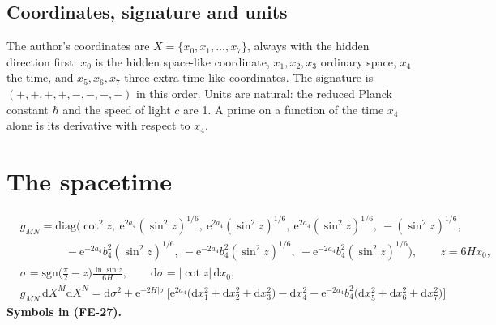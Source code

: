 \documentclass[
  10pt,
]{article}
\begin{document}
\hypertarget{coordinates-signature-and-units}{%
\subsection{Coordinates, signature and
units}\label{coordinates-signature-and-units}}

The author's coordinates are \(X = \{x_0, x_1, \dots, x_7\}\), always
with the hidden direction first: \(x_0\) is the hidden space-like
coordinate, \(x_1, x_2, x_3\) ordinary space, \(x_4\) the time, and
\(x_5, x_6, x_7\) three extra time-like coordinates. The signature is
\((+,+,+,+,-,-,-,-)\) in this order. Units are natural: the reduced
Planck constant \(\hbar\) and the speed of light \(c\) are 1. A prime on
a function of the time \(x_4\) alone is its derivative with respect to
\(x_4\).

\hypertarget{the-spacetime}{%
\section{The spacetime}\label{the-spacetime}}

\[
\begin{aligned}
&g_{MN} = \mathrm{diag}\Big(\cot^2z,\ \mathrm{e}^{2a_4}(\sin^2z)^{1/6},\ \mathrm{e}^{2a_4}(\sin^2z)^{1/6},
 \ \mathrm{e}^{2a_4}(\sin^2z)^{1/6},\ -(\sin^2z)^{1/6},\\
&\qquad\qquad -\mathrm{e}^{-2a_4}b_4^2(\sin^2z)^{1/6},\ -\mathrm{e}^{-2a_4}b_4^2(\sin^2z)^{1/6},
 \ -\mathrm{e}^{-2a_4}b_4^2(\sin^2z)^{1/6}\Big),\qquad z = 6Hx_0,\\
&\sigma = \mathrm{sgn}\Big(\frac{\pi}{2} - z\Big)\frac{\ln\sin z}{6H},\qquad \mathrm{d}\sigma = \lvert\cot z\rvert\,\mathrm{d}x_0,\\
&g_{MN}\,\mathrm{d}X^M\mathrm{d}X^N = \mathrm{d}\sigma^2 + \mathrm{e}^{-2H\lvert\sigma\rvert}\Big[\mathrm{e}^{2a_4}\big(\mathrm{d}x_1^2
 + \mathrm{d}x_2^2 + \mathrm{d}x_3^2\big) - \mathrm{d}x_4^2 - \mathrm{e}^{-2a_4}b_4^2\big(\mathrm{d}x_5^2 + \mathrm{d}x_6^2 + \mathrm{d}x_7^2\big)\Big]
\end{aligned} \tag{FE-27}
\] \textbf{Symbols in (FE-27).}
\end{document}
